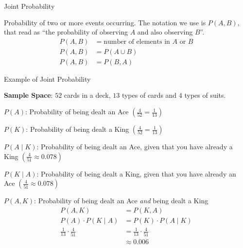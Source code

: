\begin{frame}{Joint Probability}
	\begin{defn}
		Probability of two or more events occurring. \newline \newline
		The notation we use is $P(A, B)$, that read as
		``the probability of observing $A$ and also observing $B$''. \newline \newline
		$$
			\begin{aligned}
				P(A,B) & = \text{number of elements in $A$ or $B$} \\
				P(A,B) & = P(A \cup B)                             \\
				P(A,B) & = P(B,A)
			\end{aligned}
		$$
	\end{defn}
\end{frame}

\begin{frame}{Example of Joint Probability}
	\begin{example}
		\begin{vfilleditems}
			{\footnotesize
				\item \textbf{Sample Space}: $52$ cards in a deck, $13$ types of cards and $4$ types of suits.
				\item $P(A)$: Probability of being dealt an Ace $\left( \frac{4}{52} = \frac{1}{13}\right)$
				\item $P(K)$: Probability of being dealt a King $\left( \frac{4}{52} = \frac{1}{13} \right)$
				\item $P(A \mid K)$: Probability of being dealt an Ace, given that you have already a King $\left( \frac{4}{51} \approx 0.078 \right)$
				\item $P(K \mid A)$: Probability of being dealt a King, given that you have already an Ace $\left( \frac{4}{51} \approx 0.078 \right)$
			}
			\item $P(A, K)$: Probability of being dealt an Ace \textit{and} being dealt a King
			$$
				\begin{aligned}
					P(A, K)                         & = P(K, A)                         \\
					P(A) \cdot P(K \mid A)          & = P(K) \cdot P(A \mid K)          \\
					\frac{1}{13} \cdot \frac{4}{51} & = \frac{1}{13} \cdot \frac{4}{51} \\
					                                & \approx 0.006
				\end{aligned}
			$$
		\end{vfilleditems}
	\end{example}
\end{frame}

